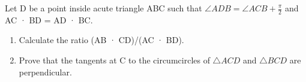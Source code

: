 \item Let D be a point inside acute triangle ABC such that $\angle ADB = \angle ACB  + \frac{\pi}{2}$ and AC · BD = AD · BC.
\begin{enumerate}
\item Calculate the ratio (AB · CD)/(AC · BD).
\item Prove that the tangents at C to the circumcircles of $\triangle ACD$ and $ \triangle BCD$ are perpendicular.
\end{enumerate}



